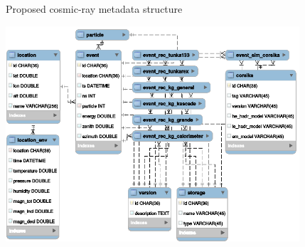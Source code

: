 \documentclass[18pt]{beamer}
\begin{document}

\begin{frame}{Proposed cosmic-ray metadata structure}
\vspace{-1.5em}
\begin{center}
\includegraphics[width=0.82\textwidth]{pics/metadata.eps}
\end{center}
\end{frame}
\end{document}
